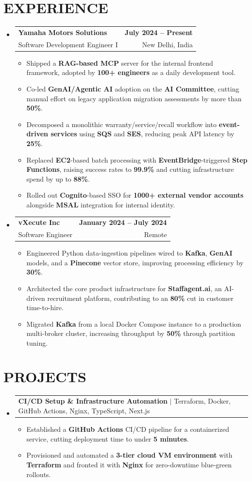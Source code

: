 \documentclass[letterpaper,10pt]{article}
\makeatletter
\renewcommand{\normalsize}{%
  \fontsize{10.1}{12.25}\selectfont
}
\newcommand{\resumeItem}[1]{
  \item\normalsize{
    {#1}
  }
}
\newcommand{\resumeSubheading}[4]{
  \item
    \begin{tabular*}{1.0\textwidth}[t]{l@{\extracolsep{\fill}}r}
      \textbf{\normalsize#1} & \textbf{\normalsize#2} \\
      {\normalsize#3} & {\normalsize#4} \\
    \end{tabular*}\vspace{1pt}
}
\newcommand{\resumeProjectHeading}[2]{
  \item
    \begin{tabular*}{1.0\textwidth}{l@{\extracolsep{\fill}}r}
      \normalsize#1 & \textbf{\normalsize#2}\\
    \end{tabular*}\vspace{2pt}
}
\newcommand{\resumeSubHeadingListStart}{\begin{itemize}[leftmargin=0.0in, label={}, itemsep=6pt, topsep=2pt]}
\newcommand{\resumeSubHeadingListEnd}{\end{itemize}}
\newcommand{\resumeItemListStart}{\begin{itemize}}
\newcommand{\resumeItemListEnd}{\end{itemize}\vspace{-3pt}}
\makeatother
\begin{document}
\section{EXPERIENCE}
  \resumeSubHeadingListStart

    \resumeSubheading
      {Yamaha Motors Solutions}{July 2024 -- Present}
      {Software Development Engineer I}{New Delhi, India}
      \resumeItemListStart
        \resumeItem{Shipped a \textbf{RAG-based MCP} server for the internal frontend framework, adopted by \textbf{100+ engineers} as a daily development tool.}
        \resumeItem{Co-led \textbf{GenAI/Agentic AI} adoption on the \textbf{AI Committee}, cutting manual effort on legacy application migration assessments by more than \textbf{50\%}.}
        \resumeItem{Decomposed a monolithic warranty/service/recall workflow into \textbf{event-driven services} using \textbf{SQS} and \textbf{SES}, reducing peak API latency by \textbf{25\%}.}
        \resumeItem{Replaced \textbf{EC2}-based batch processing with \textbf{EventBridge}-triggered \textbf{Step Functions}, raising success rates to \textbf{99.9\%} and cutting infrastructure spend by up to \textbf{88\%}.}
        \resumeItem{Rolled out \textbf{Cognito}-based SSO for \textbf{1000+ external vendor accounts} alongside \textbf{MSAL} integration for internal identity.}
      \resumeItemListEnd

    \resumeSubheading
      {vXecute Inc}{January 2024 -- July 2024}
      {Software Engineer}{Remote}
      \resumeItemListStart
        \resumeItem{Engineered Python data-ingestion pipelines wired to \textbf{Kafka}, \textbf{GenAI} models, and a \textbf{Pinecone} vector store, improving processing efficiency by \textbf{30\%}.}
        \resumeItem{Architected the core product infrastructure for \textbf{Staffagent.ai}, an AI-driven recruitment platform, contributing to an \textbf{80\%} cut in customer time-to-hire.}
        \resumeItem{Migrated \textbf{Kafka} from a local Docker Compose instance to a production multi-broker cluster, increasing throughput by \textbf{50\%} through partition tuning.}
      \resumeItemListEnd

  \resumeSubHeadingListEnd

\section{PROJECTS}
  \resumeSubHeadingListStart
    \resumeProjectHeading
      {\textbf{CI/CD Setup \& Infrastructure Automation} $|$ \textnormal{Terraform, Docker, GitHub Actions, Nginx, TypeScript, Next.js}}{}
      \resumeItemListStart
        \resumeItem{Established a \textbf{GitHub Actions} CI/CD pipeline for a containerized service, cutting deployment time to under \textbf{5 minutes}.}
        \resumeItem{Provisioned and automated a \textbf{3-tier cloud VM environment} with \textbf{Terraform} and fronted it with \textbf{Nginx} for zero-downtime blue-green rollouts.}
      \resumeItemListEnd
  \resumeSubHeadingListEnd
\end{document}
